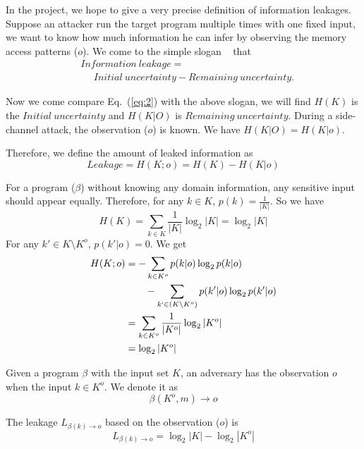 In the project, we hope to give a very precise definition of information
leakages. Suppose an attacker run the target program multiple times with one
fixed input, we want to know how much information he can infer by observing the
memory access patterns ($o$). We come to the simple slogan
~\cite{10.1007/978-3-642-00596-1_21} %
that
\begin{align*}
     & \mathit{Information\ leakage} =                                         \\
     & ~~~~~~ \mathit{Initial\ uncertainty} - \mathit{Remaining\ uncertainty}.
\end{align*}

Now we come compare Eq.~(\ref{eq:2}) with the above slogan, we will find $H(K)$
is the $\mathit{Initial\ uncertainty}$ and $H(K|O)$ is $\mathit{Remaining\
uncertainty}$. During a side-channel attack, the observation ($o$) is known.  We
have $H(K|O) = H(K|o)$.

Therefore, we define the amount of leaked information as
\begin{displaymath}
    Leakage = H(K;o) = H(K) - H(K|o)
\end{displaymath}

For a program ($\beta$) without knowing any domain information, any sensitive
input should appear equally. Therefore, for any $k \in K$, $p(k) =
\frac{1}{|K|}$. So we have
$$H(K) = \sum_{k {\in} K}\frac{1}{|K|}\log_2{|K|} = \log_2{|K|}$$
For any $k' \in K \setminus K^o$, $p(k'|o) = 0$. We get
\begin{align*}
    H(K;o) & = - \sum_{k {\in} K^o}{p(k|o)\log_2p(k|o)}                         \\
           & \qquad   - \sum_{k` {\in} (K \setminus K^o)}{p(k'|o)\log_2p(k'|o)} \\
           & = \sum_{k {\in} K^o}\frac{1}{|K^o|}\log_2{|K^o|}                   \\
           & = \log_2{|K^o|}
\end{align*}


\begin{mydef}
    \label{def}
    Given a program $\beta$ with the input set $K$,
    an adversary has the observation $o$ when the input $k{\in}K^o$.
    We denote it as
    $$\beta(K^o, m) \rightarrow	o$$

    The leakage $L_{\beta(k)\rightarrow o}$ based on the observation ($o$) is
    $$L_{\beta(k)\rightarrow o} = \log_2{|K|} - \log_2{|K^o|}$$
\end{mydef}

